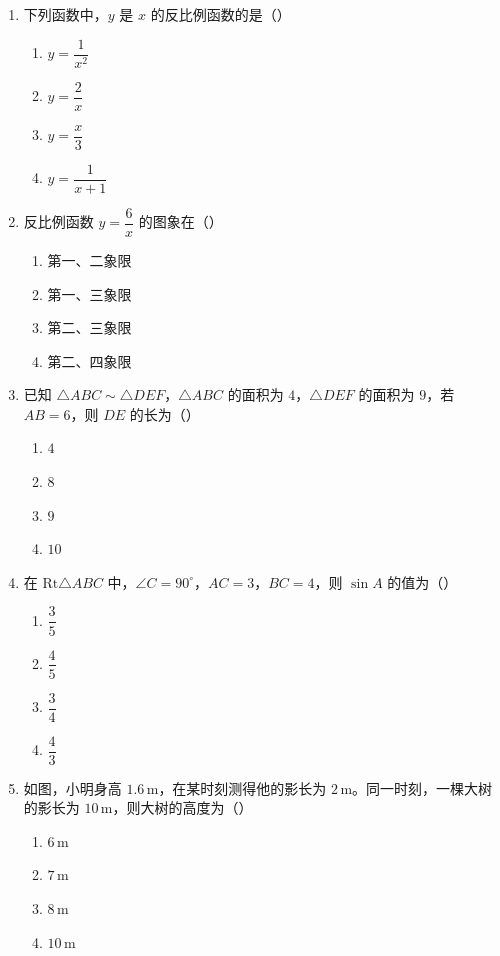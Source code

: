 \documentclass[12pt, a4paper]{ctexart}
\begin{document}
\begin{enumerate}[label=\arabic*.]

\item 下列函数中，$y$ 是 $x$ 的反比例函数的是（\quad）
\begin{enumerate}[label=\Alph*.]
\item $y = \dfrac{1}{x^2}$
\item $y = \dfrac{2}{x}$
\item $y = \dfrac{x}{3}$
\item $y = \dfrac{1}{x + 1}$
\end{enumerate}

\item 反比例函数 $y = \dfrac{6}{x}$ 的图象在（\quad）
\begin{enumerate}[label=\Alph*.]
\item 第一、二象限
\item 第一、三象限
\item 第二、三象限
\item 第二、四象限
\end{enumerate}

\item 已知 $\triangle ABC \sim \triangle DEF$，$\triangle ABC$ 的面积为 $4$，$\triangle DEF$ 的面积为 $9$，若 $AB = 6$，则 $DE$ 的长为（\quad）
\begin{enumerate}[label=\Alph*.]
\item $4$
\item $8$
\item $9$
\item $10$
\end{enumerate}

\item 在 $\text{Rt}\triangle ABC$ 中，$\angle C = 90^\circ$，$AC = 3$，$BC = 4$，则 $\sin A$ 的值为（\quad）
\begin{enumerate}[label=\Alph*.]
\item $\dfrac{3}{5}$
\item $\dfrac{4}{5}$
\item $\dfrac{3}{4}$
\item $\dfrac{4}{3}$
\end{enumerate}

\item 如图，小明身高 $1.6\,\text{m}$，在某时刻测得他的影长为 $2\,\text{m}$。同一时刻，一棵大树的影长为 $10\,\text{m}$，则大树的高度为（\quad）
\begin{enumerate}[label=\Alph*.]
\item $6\,\text{m}$
\item $7\,\text{m}$
\item $8\,\text{m}$
\item $10\,\text{m}$
\end{enumerate}


\end{enumerate}
\end{document}

